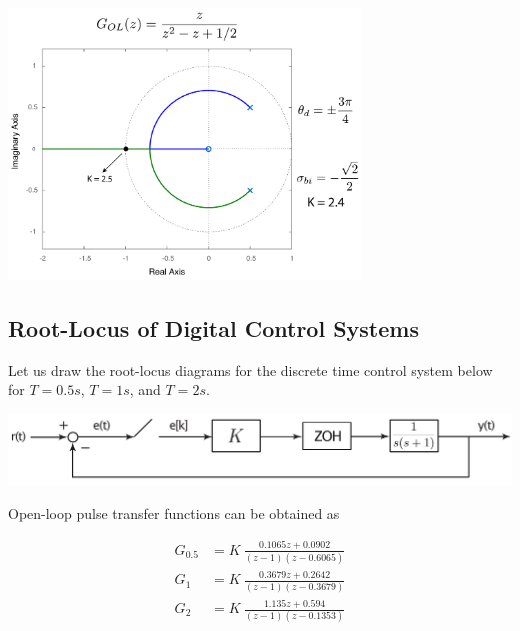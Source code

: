 \documentclass[twoside]{article}
\begin{document}
\begin{center}
\begin{minipage}[h]{\linewidth}
    \begin{center}
      \includegraphics[width=0.7\textwidth]{E5}
    \end{center}
\end{minipage}
    \end{center}

\newpage

\subsection*{Root-Locus of Digital Control Systems}

Let us draw the root-locus diagrams for the discrete time control
system below for $T = 0.5 s$, $T = 1 s$, and $T = 2 s$. 

\begin{center}
\begin{minipage}[h]{\linewidth}
    \begin{center}
      \includegraphics[width=\textwidth]{digitalblock}
    \end{center}
\end{minipage}
\end{center}

Open-loop pulse transfer functions can be obtained as

\begin{align*}
G_{0.5} &= K \ \frac{ 0.1065 z + 0.0902 }{(z-1) (z - 0.6065)}
\\
G_{1} &= K \ \frac{0.3679 z + 0.2642 }{(z-1) (z - 0.3679)}
\\
G_{2} &= K \ \frac{1.135 z + 0.594}{(z-1) (z - 0.1353)}
\end{align*}
\end{document}
